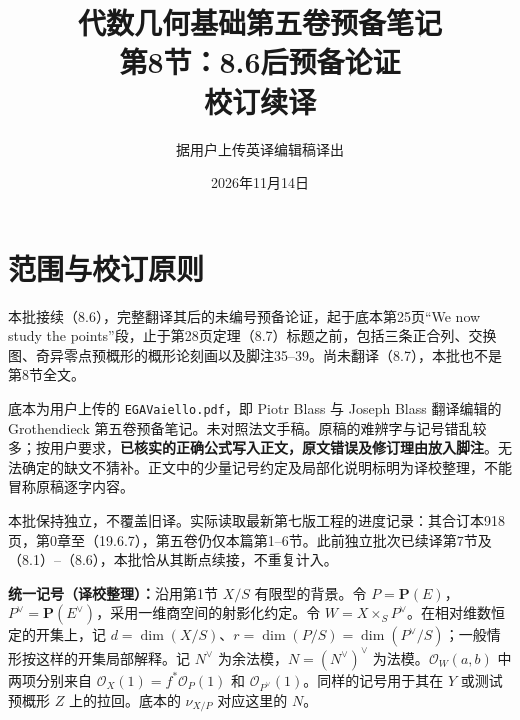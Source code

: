 \documentclass{ctexbook}
\title{代数几何基础第五卷预备笔记\\第8节：8.6后预备论证\\校订续译}
\author{据用户上传英译编辑稿译出}
\date{2026年11月14日}
\newcommand{\cO}{\mathcal O}
\begin{document}
\maketitle
\frontmatter
\chapter*{范围与校订原则}
本批接续（8.6），完整翻译其后的未编号预备论证，起于底本第25页“We now study the points”段，止于第28页定理（8.7）标题之前，包括三条正合列、交换图、奇异零点预概形的概形论刻画以及脚注35--39。尚未翻译（8.7），本批也不是第8节全文。

底本为用户上传的 \texttt{EGAVaiello.pdf}，即 Piotr Blass 与 Joseph Blass 翻译编辑的 Grothendieck 第五卷预备笔记。未对照法文手稿。原稿的难辨字与记号错乱较多；按用户要求，\textbf{已核实的正确公式写入正文，原文错误及修订理由放入脚注}。无法确定的缺文不猜补。正文中的少量记号约定及局部化说明标明为译校整理，不能冒称原稿逐字内容。

本批保持独立，不覆盖旧译。实际读取最新第七版工程的进度记录：其合订本918页，第0章至（19.6.7），第五卷仍仅本篇第1--6节。此前独立批次已续译第7节及（8.1）--（8.6），本批恰从其断点续接，不重复计入。

\textbf{统一记号（译校整理）：}沿用第1节 $X/S$ 有限型的背景。令 $P=\mathbf P(E)$，$P^\vee=\mathbf P(E^\vee)$，采用一维商空间的射影化约定。令 $W=X\times_S P^\vee$。在相对维数恒定的开集上，记 $d=\dim(X/S)$、$r=\dim(P/S)=\dim(P^\vee/S)$；一般情形按这样的开集局部解释。记 $N^\vee$ 为余法模，$N=(N^\vee)^\vee$ 为法模。$\cO_W(a,b)$ 中两项分别来自 $\cO_X(1)=f^*\cO_P(1)$ 和 $\cO_{P^\vee}(1)$。同样的记号用于其在 $Y$ 或测试预概形 $Z$ 上的拉回。底本的 $\nu_{X/P}$ 对应这里的 $N$。

\mainmatter
\end{document}
